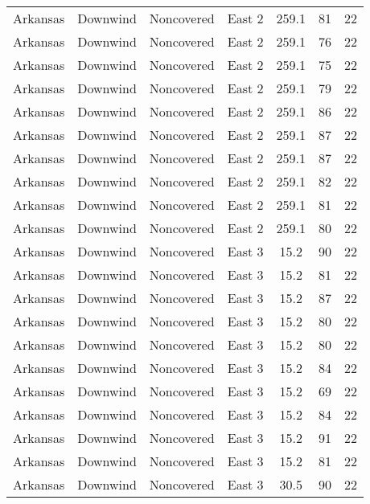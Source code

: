 \documentclass{article}
\begin{document}
\begin{longtable}[H]{ccccccc}
Arkansas & Downwind  & Noncovered & East 2        & 259.1        & 81          & 22  \\
Arkansas & Downwind  & Noncovered & East 2        & 259.1        & 76          & 22  \\
Arkansas & Downwind  & Noncovered & East 2        & 259.1        & 75          & 22  \\
Arkansas & Downwind  & Noncovered & East 2        & 259.1        & 79          & 22  \\
Arkansas & Downwind  & Noncovered & East 2        & 259.1        & 86          & 22  \\
Arkansas & Downwind  & Noncovered & East 2        & 259.1        & 87          & 22  \\
Arkansas & Downwind  & Noncovered & East 2        & 259.1        & 87          & 22  \\
Arkansas & Downwind  & Noncovered & East 2        & 259.1        & 82          & 22  \\
Arkansas & Downwind  & Noncovered & East 2        & 259.1        & 81          & 22  \\
Arkansas & Downwind  & Noncovered & East 2        & 259.1        & 80          & 22  \\
Arkansas & Downwind  & Noncovered & East 3        & 15.2         & 90          & 22  \\
Arkansas & Downwind  & Noncovered & East 3        & 15.2         & 81          & 22  \\
Arkansas & Downwind  & Noncovered & East 3        & 15.2         & 87          & 22  \\
Arkansas & Downwind  & Noncovered & East 3        & 15.2         & 80          & 22  \\
Arkansas & Downwind  & Noncovered & East 3        & 15.2         & 80          & 22  \\
Arkansas & Downwind  & Noncovered & East 3        & 15.2         & 84          & 22  \\
Arkansas & Downwind  & Noncovered & East 3        & 15.2         & 69          & 22  \\
Arkansas & Downwind  & Noncovered & East 3        & 15.2         & 84          & 22  \\
Arkansas & Downwind  & Noncovered & East 3        & 15.2         & 91          & 22  \\
Arkansas & Downwind  & Noncovered & East 3        & 15.2         & 81          & 22  \\
Arkansas & Downwind  & Noncovered & East 3        & 30.5         & 90          & 22  \\

\end{longtable}
\end{document}

